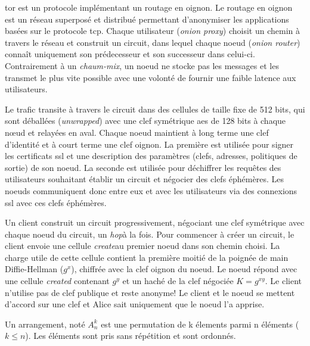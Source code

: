 \acrshort{tor}\cite{tor_wp} est un protocole implémentant un routage en oignon.
Le routage en oignon est un réseau superposé et distribué
permettant d'anonymiser les applications basées sur le protocole \acrshort{tcp}.
Chaque utilisateur (\og \textit{onion proxy}\fg) choisit un chemin à travers le réseau et 
construit un circuit, dans lequel chaque noeud (\og \textit{onion router}\fg) connaît 
uniquement son prédecesseur et son successeur dans celui-ci. 
Contrairement à un \og \textit{chaum-mix}\fg, un noeud ne stocke pas les messages 
et les transmet le plus vite possible avec une volonté de fournir 
une faible latence aux utilisateurs.

\medskip 

Le trafic transite à travers le circuit dans des cellules de taille fixe de 512 bits, 
qui sont déballées (\og \textit{unwrapped}\fg) avec une clef symétrique \acrshort{aes} 
de 128 bits à chaque nœud et relayées en aval.
Chaque noeud maintient à long terme une clef d'identité et à court terme une clef oignon.
La première est utilisée pour signer les certificats \acrshort{ssl} et une description 
des paramètres (clefs, adresses, politiques de sortie) de son noeud.
La seconde est utilisée pour déchiffrer les requêtes des utilisateurs souhaitant 
établir un circuit et négocier des clefs éphémères.
Les noeuds communiquent donc entre eux et avec les utilisateurs via des connexions 
\acrshort{ssl} avec ces clefs éphémères.

\medskip 

Un client construit un circuit progressivement, négociant une clef symétrique
avec chaque noeud du circuit, un \og \textit{hop}\fg à la fois.
Pour commencer à créer un circuit, le client envoie une cellule 
\og \textit{create}\fg au premier noeud dans son chemin choisi. 
La charge utile de cette cellule contient la première moitié de la 
poignée de main Diffie-Hellman ($g^x$), chiffrée avec la clef oignon
du noeud. Le noeud répond avec une cellule \og \textit{created}\fg
contenant $g^y$ et un haché de la clef négociée $K=g^{xy}$.
Le client n'utilise pas de clef publique et reste anonyme! Le client et
le noeud se mettent d'accord sur une clef et Alice sait uniquement 
que le noeud l'a apprise.

\begin{definition}[Arrangement]
    Un arrangement, noté $A^k_n$ est une permutation de k élements parmi n éléments 
    ($k \leq n$).
    Les éléments sont pris sans répétition et sont ordonnés.   
\end{definition}

